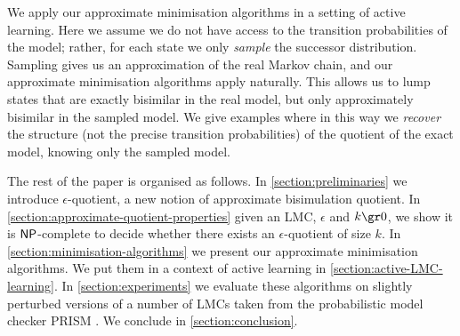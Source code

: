 We apply our approximate minimisation algorithms in a setting of active learning.
Here we assume we do not have access to the transition probabilities of the model; rather, for each state we only \emph{sample} the successor distribution.
Sampling gives us an approximation of the real Markov chain, and our approximate minimisation algorithms apply naturally.
This allows us to lump states that are exactly bisimilar in the real model, but only approximately bisimilar in the sampled model.
We give examples where in this way we \emph{recover} the structure (not the precise transition probabilities) of the quotient of the exact model, knowing only the sampled model.

The rest of the paper is organised as follows. In \cref{section:preliminaries} we introduce $\epsilon$-quotient, a new notion of approximate bisimulation quotient. In \cref{section:approximate-quotient-properties} given an LMC, $\epsilon$ and $k \gr 0$, we show it is ${\sf NP}$-complete to decide whether there exists an $\epsilon$-quotient of size $k$. In \cref{section:minimisation-algorithms} we present our approximate minimisation algorithms.
We put them in a context of active learning in \cref{section:active-LMC-learning}.
In \cref{section:experiments} we evaluate these algorithms on slightly perturbed versions of a number of LMCs taken from the probabilistic model checker PRISM \cite{KNP11}. We conclude in \cref{section:conclusion}. 